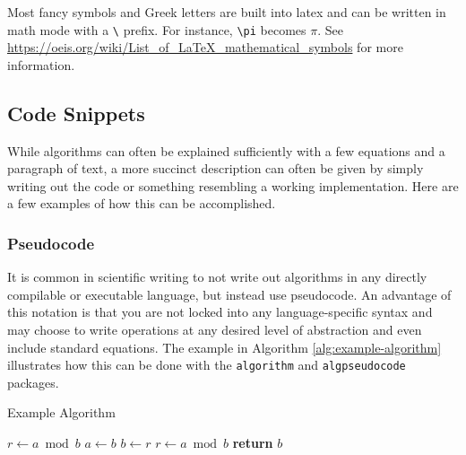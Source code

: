 Most fancy symbols and Greek letters are built into latex and can be written in math mode with a \verb|\| prefix.
For instance, \verb|\pi| becomes $\pi$. 
See \url{https://oeis.org/wiki/List_of_LaTeX_mathematical_symbols} for more information.






\subsection{Code Snippets}

While algorithms can often be explained sufficiently with a few equations and a paragraph of text, a more succinct description can often be given by simply writing out the code or something resembling a working implementation.
Here are a few examples of how this can be accomplished.

\subsubsection{Pseudocode}

It is common in scientific writing to not write out algorithms in any directly compilable or executable language, but instead use pseudocode. 
An advantage of this notation is that you are not locked into any language-specific syntax and may choose to write operations at any desired level of abstraction and even include standard equations.
The example in Algorithm \ref{alg:example-algorithm} illustrates how this can be done with the \verb|algorithm| and \verb|algpseudocode| packages.

\begin{algorithm}
    \caption{Example Algorithm}
    \label{alg:example-algorithm}
    \begin{algorithmic}
            \State $r\gets a\bmod b$
                \State $a\gets b$
                \State $b\gets r$
                \State $r\gets a\bmod b$
            \EndWhile\label{euclidendwhile}
            \State \textbf{return} $b$
        \EndProcedure
    \end{algorithmic}
\end{algorithm} 


